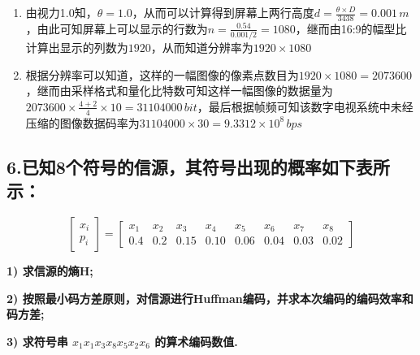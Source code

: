 \documentclass[]{article}
\begin{document}
\begin{enumerate}[(1)]
    \item
        由视力1.0知，$\theta=1.0$，从而可以计算得到屏幕上两行高度$d=\frac{\theta \times D}{3438}=0.001\,m$，由此可知屏幕上可以显示的行数为$n=\frac{0.54}{0.001/2}=1080$，继而由16:9的幅型比计算出显示的列数为$1920$，从而知道分辨率为$1920\times 1080$
        
    \item
        根据分辨率可以知道，这样的一幅图像的像素点数目为$1920\times 1080=2073600$，继而由采样格式和量化比特数可知这样一幅图像的数据量为$2073600\times \frac{4+2}{4}\times 10=31104000\,bit$，最后根据帧频可知该数字电视系统中未经压缩的图像数据码率为$31104000\times 30=9.3312\times 10^8\,bps$
        
\end{enumerate}
\hypertarget{header-n106}{%
\subsection{6.已知8个符号的信源，其符号出现的概率如下表所示：}\label{header-n106}}
$$
\begin{bmatrix}x_i\\ p_i  \end{bmatrix}=\begin{bmatrix}x_1 & x_2 & x_3 & x_4 & x_5 & x_6 & x_7 & x_8 \\ 0.4 & 0.2 & 0.15 & 0.10 & 0.06 & 0.04 & 0.03 & 0.02 \end{bmatrix}
$$

\textbf{1) 求信源的熵H;}

\textbf{2) 按照最小码方差原则，对信源进行Huffman编码，并求本次编码的编码效率和码方差;}

\textbf{3) 求符号串 $x_1 x_1 x_3 x_8 x_5 x_2 x_6$ 的算术编码数值.}
\end{document}
